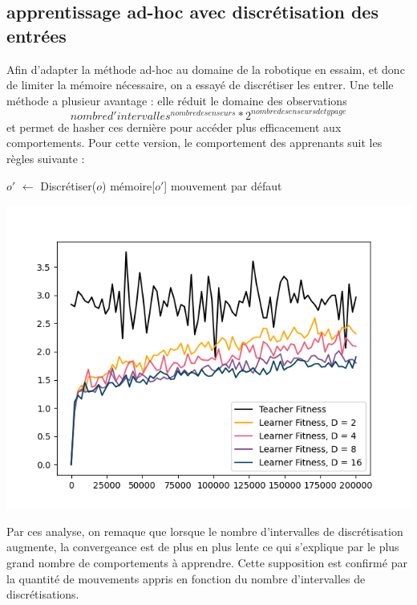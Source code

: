 \documentclass[a4paper, 12pt]{report}
\begin{document}
	\subsection{apprentissage ad-hoc avec discrétisation des entrées}
	Afin d'adapter la méthode ad-hoc au domaine de la robotique en essaim, et donc de limiter la mémoire nécessaire, on a essayé de discrétiser les entrer. Une telle méthode a plusieur avantage : elle réduit le domaine des observations $$nombre d'intervalles^{nombre de senseurs}*2^{nombre de senseurs de typage} $$ et permet de hasher ces dernière pour accéder plus efficacement aux comportements.
	Pour cette version, le comportement des apprenants suit les règles suivante :
	

\begin{algorithm}[H]
	\;
	$o'$ $\leftarrow$ Discrétiser($o$)\;
	{\Return mémoire[$o'$]}
	\Return mouvement par défaut\;
\end{algorithm}
	
	
\includegraphics{averageComparisons}


	Par ces analyse, on remaque que lorsque le nombre d'intervalles de discrétisation augmente, la convergeance est de plus en plus lente ce qui s'explique par le plus grand nombre de comportements à apprendre.
	 Cette supposition est confirmé par la quantité de mouvements appris en fonction du nombre d'intervalles de discrétisations.
	 
\end{document}
